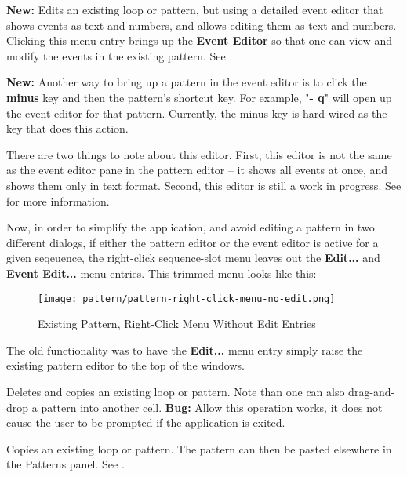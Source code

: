    \textbf{New:}
   Edits an existing loop or pattern, but using a detailed event editor that
   shows events as text and numbers, and allows editing them as text and
   numbers.
   Clicking this menu entry brings up the \textbf{Event Editor}
   so that one can view and modify the events in the existing pattern.
   See .

   \textbf{New:}
   Another way to bring up a pattern in the event editor is to
   click the \textbf{minus} key and then the pattern's shortcut key.
   For example, "\textbf{- q}" will open up the event editor for that pattern.
   Currently, the minus key is hard-wired as the key that does this action.

   There are two things to note about this editor.
   First, this editor is not the same as the event editor pane in the pattern
   editor -- it shows all events at once, and shows them only in text format.
   Second, this editor is still a work in progress.
   See  for more information.

   Now, in order to simplify the application, and avoid editing a pattern in
   two different dialogs, if either the pattern editor or the event editor is
   active for a given seqeuence, the right-click sequence-slot menu leaves out
   the \textbf{Edit...} and \textbf{Event Edit...} menu entries.
   This trimmed menu looks like this:

\begin{figure}[H]
   \centering 
   \texttt{[image: pattern/pattern-right-click-menu-no-edit.png]}
   \caption{Existing Pattern, Right-Click Menu Without Edit Entries}
   \label{fig:pattern_window_right_click_no_edit}
\end{figure}

   The old functionality was to have the \textbf{Edit...} menu entry simply
   raise the existing pattern editor to the top of the windows.

   Deletes and copies an existing loop or pattern.
   Note than one can also drag-and-drop a pattern into another cell.
   \textbf{Bug:}
   Allow this operation works, it does not cause the user to be prompted if the
   application is exited.

   Copies an existing loop or pattern.
   The pattern can then be pasted elsewhere in the Patterns panel.
   See .


